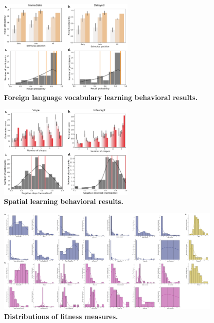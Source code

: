\documentclass[10pt]{article}
\begin{document}
\begin{figure}[p]
\centering
\includegraphics[width=0.6\textwidth]{figs/vocab_learning_behavior}
\caption{\textbf{Foreign language vocabulary learning behavioral results.}}
\label{fig:vocab_behavioral}
\end{figure}

\begin{figure}[p]
\centering
\includegraphics[width=0.6\textwidth]{figs/spatial_learning_behavior}
\caption{\textbf{Spatial learning behavioral results.}}
\label{fig:spatial_behavioral}
\end{figure}

\begin{figure}
\centering
\includegraphics[width=\textwidth]{figs/fitness_distributions}
\caption{\textbf{Distributions of fitness measures.}}
\label{fig:fitness_dists}
\end{figure}
\end{document}
